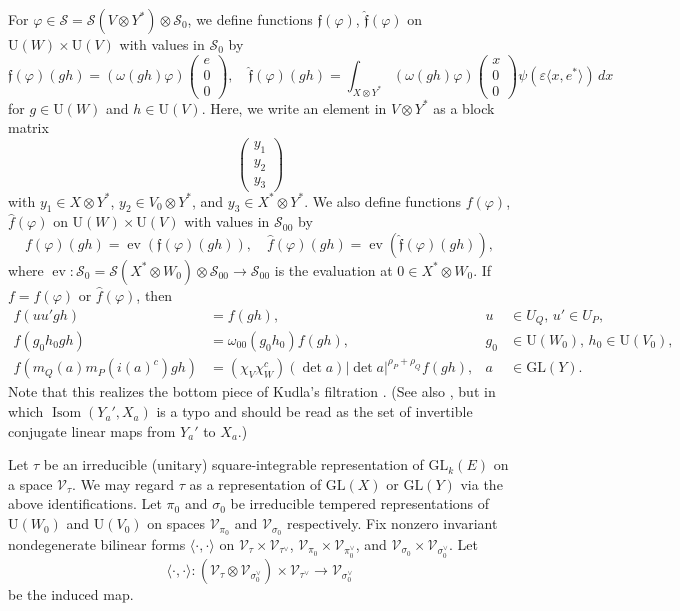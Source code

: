 \documentclass[11pt]{amsart}
\numberwithin{equation}{section}
\theoremstyle{plain}
\theoremstyle{definition}
\theoremstyle{remark}
\def\ev{\operatorname{ev}}
\def\GL{\mathrm{GL}}
\def\U{\mathrm{U}}
\def\s{\mathscr{S}}
\def\V{\mathscr{V}}
\def\ff{\mathfrak{f}}
\begin{document}
For $\varphi \in \s = \s(V \otimes Y^*) \otimes \s_0$, we define functions $\ff(\varphi)$, $\hat{\ff}(\varphi)$ on $\U(W) \times \U(V)$ with values in $\s_0$ by
\[
 \ff(\varphi)(gh)
 = (\omega(gh)\varphi)
 \begin{pmatrix}
  e \\
  0 \\
  0 
 \end{pmatrix}, \quad
 \hat{\ff}(\varphi)(gh) = \int_{X \otimes Y^*} (\omega(gh)\varphi)
 \begin{pmatrix}
  x \\
  0 \\
  0
 \end{pmatrix}
 \psi(\varepsilon \langle x, e^* \rangle) \, dx
\]
for $g \in \U(W)$ and $h \in \U(V)$.
Here, we write an element in $V \otimes Y^*$ as a block matrix
\[
 \begin{pmatrix}
  y_1 \\
  y_2 \\
  y_3
 \end{pmatrix}
\]
with $y_1 \in X \otimes Y^*$, $y_2 \in V_0 \otimes Y^*$, and $y_3 \in X^* \otimes Y^*$.
We also define functions $f(\varphi)$, $\hat{f}(\varphi)$ on $\U(W) \times \U(V)$ with values in $\s_{00}$ by
\[
 f(\varphi)(gh) = \ev(\ff(\varphi)(gh)), \quad
 \hat{f}(\varphi)(gh) = \ev(\hat{\ff}(\varphi)(gh)),
\]
where $\ev : \s_0 = \s(X^* \otimes W_0) \otimes \s_{00} \rightarrow \s_{00}$ is the evaluation at $0 \in X^* \otimes W_0$.
If $f = f(\varphi)$ or $\hat{f}(\varphi)$, then
\begin{align*}
 f(u u' gh) & = f(gh), & u & \in U_Q, \, u' \in U_P, \\ 
 f(g_0h_0gh) & = \omega_{00}(g_0h_0) f(gh), & g_0 & \in \U(W_0), \, h_0 \in \U(V_0), \\ 
 f(m_Q(a) m_P(i(a)^c) gh) & = (\chi_V \chi_W^c)(\det a) |\det a|^{\rho_P+\rho_Q} f(gh), & a & \in \GL(Y).
\end{align*}
Note that this realizes the bottom piece of Kudla's filtration \cite{kudla}.
(See also \cite[Lemma C.2]{gi}, but in which $\operatorname{Isom}(Y_a', X_a)$ is a typo and should be read as the set of invertible conjugate linear maps from $Y_a'$ to $X_a$.)

Let $\tau$ be an irreducible (unitary) square-integrable representation of $\GL_k(E)$ on a space $\V_{\tau}$.
We may regard $\tau$ as a representation of $\GL(X)$ or $\GL(Y)$ via the above identifications.
Let $\pi_0$ and $\sigma_0$ be irreducible tempered representations of $\U(W_0)$ and $\U(V_0)$ on spaces $\V_{\pi_0}$ and $\V_{\sigma_0}$ respectively.
Fix nonzero invariant nondegenerate bilinear forms $\langle \cdot , \cdot \rangle$ on $\V_{\tau} \times \V_{\tau^\vee}$, $\V_{\pi_0} \times \V_{\pi_0^\vee}$, and $\V_{\sigma_0} \times \V_{\sigma_0^\vee}$.
Let 
\[
 \langle \cdot, \cdot \rangle : (\V_{\tau} \otimes \V_{\sigma_0^\vee}) \times \V_{\tau^\vee} \longrightarrow \V_{\sigma_0^\vee}
\]
be the induced map.
\end{document}
